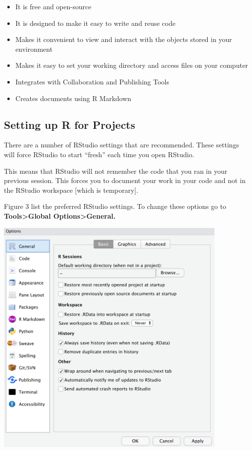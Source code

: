 \documentclass[
]{article}
\providecommand{\tightlist}{%
  \setlength{\itemsep}{0pt}\setlength{\parskip}{0pt}}
\begin{document}
\begin{itemize}
\tightlist
\item
  It is free and open-source
\item
  It is designed to make it easy to write and reuse code
\item
  Makes it convenient to view and interact with the objects stored in
  your environment
\item
  Makes it easy to set your working directory and access files on your
  computer
\item
  Integrates with Collaboration and Publishing Tools
\item
  Creates documents using R Markdown
\end{itemize}

\hypertarget{setting-up-r-for-projects}{%
\subsection{Setting up R for Projects}\label{setting-up-r-for-projects}}

There are a number of RStudio settings that are recommended. These
settings will force RStudio to start ``fresh'' each time you open
RStudio.

This means that RStudio will not remember the code that you ran in your
previous session. This forces you to document your work in your code and
not in the RStudio workspace {[}which is temporary{]}.

Figure 3 list the preferred RStudio settings. To change these options go
to \textbf{Tools\textgreater Global Options\textgreater General.}

\includegraphics[width=4.5in,height=\textheight]{images/rstudio-preferences.png}
\end{document}
